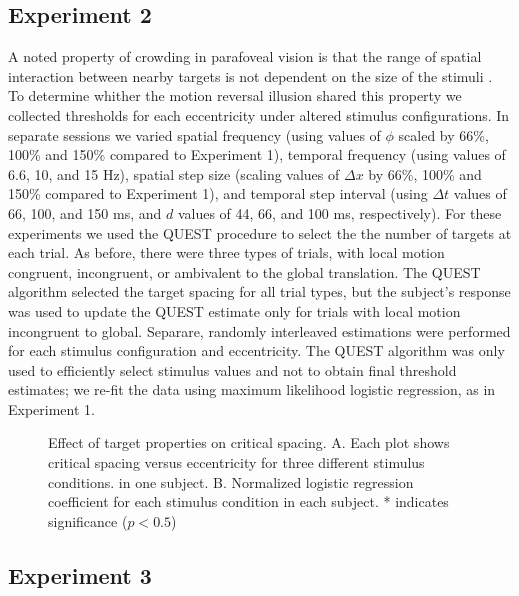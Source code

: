 \documentclass[11pt]{amsart}
\begin{document}
\subsection{Experiment 2}

A noted property of crowding in parafoveal vision is that the range of
spatial interaction between nearby targets is not dependent on the
size of the stimuli \cite{Levi:2002cs}. To determine whither the
motion reversal illusion shared this property we collected thresholds
for each eccentricity under altered stimulus configurations. In
separate sessions we varied spatial frequency (using values of $\phi$
scaled by 66\%, 100\% and 150\% compared to Experiment 1), temporal
frequency (using values of 6.6, 10, and 15 Hz), spatial step size
(scaling values of ${\Delta}x$ by 66\%, 100\% and 150\% compared to
Experiment 1), and temporal step interval (using ${\Delta}t$ values of
66, 100, and 150 ms, and $d$ values of 44, 66, and 100 ms,
respectively). For these experiments we used the QUEST procedure
\cite{Watson:1983hc} to select the the number of targets at each
trial. As before, there were three types of trials, with local motion
congruent, incongruent, or ambivalent to the global translation. The
QUEST algorithm selected the target spacing for all trial types, but
the subject's response was used to update the QUEST estimate only for
trials with local motion incongruent to global. Separare, randomly
interleaved estimations were performed for each stimulus configuration
and eccentricity. The QUEST algorithm was only used to efficiently
select stimulus values and not to obtain final threshold estimates; we
re-fit the data using maximum likelihood logistic regression, as in
Experiment 1.

\begin{figure}
  \caption{Effect of target properties on critical spacing. A. Each
    plot shows critical spacing versus eccentricity for three
    different stimulus conditions. in one subject. B. Normalized
    logistic regression coefficient for each stimulus condition in
    each subject. * indicates significance ($p < 0.5$) }
\end{figure}

\subsection{Experiment 3}
\end{document}
